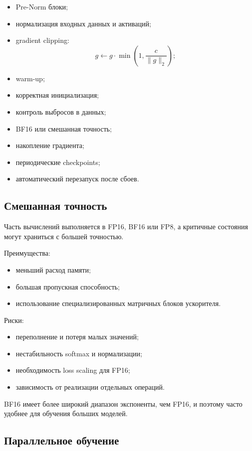 \documentclass[12pt,a4paper]{article}
\newcommand{\1}{\mathbf{1}}
\theoremstyle{definition}
\theoremstyle{remark}
\begin{document}
\begin{itemize}
    \item Pre-Norm блоки;
    \item нормализация входных данных и активаций;
    \item gradient clipping:
    \[
    g\leftarrow
    g\cdot
    \min\left(1,\frac{c}{\|g\|_2}\right);
    \]
    \item warm-up;
    \item корректная инициализация;
    \item контроль выбросов в данных;
    \item BF16 или смешанная точность;
    \item накопление градиента;
    \item периодические checkpoints;
    \item автоматический перезапуск после сбоев.
\end{itemize}

\subsection{Смешанная точность}

Часть вычислений выполняется в FP16, BF16 или FP8, а критичные состояния
могут храниться с большей точностью.

Преимущества:

\begin{itemize}
    \item меньший расход памяти;
    \item большая пропускная способность;
    \item использование специализированных матричных блоков ускорителя.
\end{itemize}

Риски:

\begin{itemize}
    \item переполнение и потеря малых значений;
    \item нестабильность softmax и нормализации;
    \item необходимость loss scaling для FP16;
    \item зависимость от реализации отдельных операций.
\end{itemize}

BF16 имеет более широкий диапазон экспоненты, чем FP16, и поэтому часто
удобнее для обучения больших моделей.

\subsection{Параллельное обучение}
\end{document}
